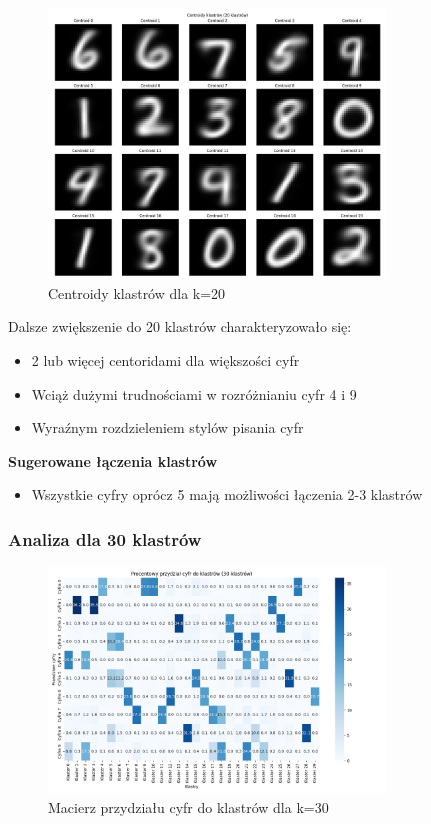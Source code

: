 \documentclass[12pt,a4paper]{article}
\begin{document}
\begin{figure}[H]
\centering
\includegraphics[width=0.8\textwidth]{img/centroidy20.png}
\caption{Centroidy klastrów dla k=20}
\end{figure}


Dalsze zwiększenie do 20 klastrów charakteryzowało się:
\begin{itemize}
    \item 2 lub więcej centoridami dla większości cyfr
    \item Wciąż dużymi trudnościami w rozróżnianiu cyfr 4 i 9
    \item Wyraźnym rozdzieleniem stylów pisania cyfr
\end{itemize}

\noindent \textbf{Sugerowane łączenia klastrów}
\begin{itemize}
    \item Wszystkie cyfry oprócz 5 mają możliwości łączenia 2-3 klastrów
\end{itemize}

\subsubsection{Analiza dla 30 klastrów}

\begin{figure}[H]
\centering
\includegraphics[width=0.8\textwidth]{img/macierz30.png}
\caption{Macierz przydziału cyfr do klastrów dla k=30}
\end{figure}
\end{document}
